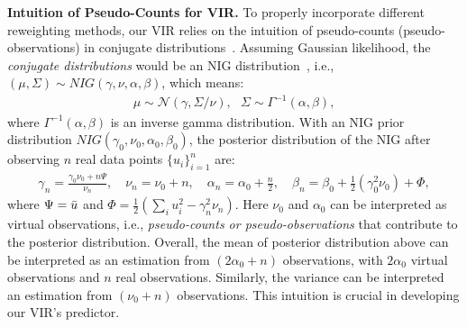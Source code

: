 \textbf{Intuition of Pseudo-Counts for VIR.} To properly incorporate different reweighting methods, our VIR relies on the intuition of pseudo-counts (pseudo-observations) in conjugate distributions~\citep{PRML}. 
Assuming Gaussian likelihood, the \emph{conjugate distributions} would be an NIG distribution~\citep{PRML}, i.e., $(\mu, \Sigma) \sim NIG (\gamma, \nu, \alpha, \beta)$, which means:
%
\begin{align*}
\mu \sim \mathcal{N} (\gamma, \Sigma / \nu), \ \ \ 
\Sigma \sim \Gamma^{-1} (\alpha, \beta),
\end{align*}
%
where $\Gamma^{-1} (\alpha, \beta)$ is an inverse gamma distribution. With an NIG prior distribution $NIG( \gamma_{0}, \nu_{0}, \alpha_{0}, \beta_{0} )$, the posterior distribution of the NIG after observing $n$ real data points $\{u_i\}_{i=1}^n$ are: 
%
\begin{align}
\gamma_n = \frac{\gamma_{0} \nu_{0} + n \Psi}{\nu_{n}}, \quad
\nu_{n} = \nu_{0} + n, \quad
\alpha_{n} = \alpha_{0} + \frac{n}{2}, \quad
\beta_{n} = \beta_{0} + \frac{1}{2}(\gamma_{0}^{2} \nu_{0}) + \Phi, \label{eq:nig}
\end{align}
%
where $\Psi = \Bar{u}$ and $\Phi = \frac{1}{2}(\sum_{i} u_{i}^{2} - \gamma_{n}^{2} \nu_{n})$. %
Here $\nu_0$ and $\alpha_0$ can be interpreted as virtual observations, i.e., \emph{pseudo-counts or pseudo-observations} that contribute to the posterior distribution. Overall, the mean of posterior distribution above can be interpreted as an estimation from $(2\alpha_0+n)$ observations, with $2\alpha_0$ virtual observations and $n$ real observations. 
Similarly, the variance can be interpreted an estimation from $(\nu_0+n)$ observations. This intuition is crucial in {developing our VIR's predictor.} 

